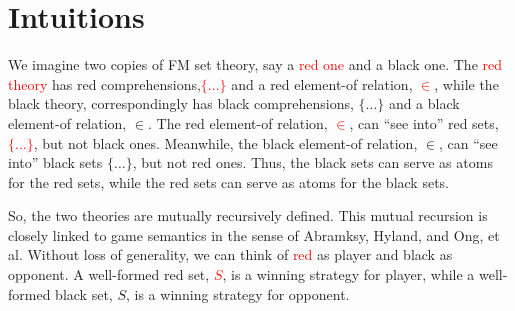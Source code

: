 \section{Intuitions}
We imagine two copies of FM set theory, say a \textcolor{red}{red one}
and a black one. The \textcolor{red}{red theory} has red
comprehensions,\textcolor{red}{$\{ \ldots \}$} and a red element-of
relation, \textcolor{red}{$\in$}, while the black theory,
correspondingly has black comprehensions, $\{ \ldots \}$ and a black
element-of relation, $\in$. The red element-of relation,
\textcolor{red}{$\in$}, can ``see into'' red sets, \textcolor{red}{$\{
  \ldots \}$}, but not black ones. Meanwhile, the black element-of
relation, $\in$, can ``see into'' black sets $\{ \ldots \}$, but not
red ones. Thus, the black sets can serve as atoms for the red sets,
while the red sets can serve as atoms for the black sets.

So, the two theories are mutually recursively defined. This mutual
recursion is closely linked to game semantics in the sense of
Abramksy, Hyland, and Ong, et al. Without loss of generality, we can
think of \textcolor{red}{red} as player and black as opponent. A
well-formed red set, \textcolor{red}{$S$}, is a winning strategy for
player, while a well-formed black set, $S$, is a winning strategy for
opponent.
